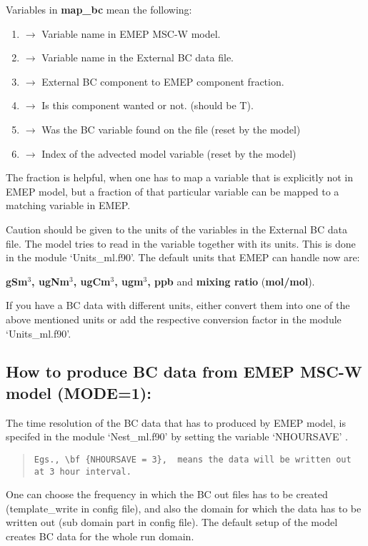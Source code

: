Variables in {\bf map\_bc} mean the following: 

\begin{enumerate}
\item ${\rightarrow}$  Variable name in EMEP MSC-W model.
\item ${\rightarrow}$  Variable name in the External BC data file. 
\item ${\rightarrow}$  External BC component to EMEP component fraction.  
\item ${\rightarrow}$  Is this component wanted or not.  (should be T). 
\item ${\rightarrow}$  Was the BC variable found on the file (reset by the model)
\item ${\rightarrow}$  Index of the advected model variable (reset by the model)			 
\end{enumerate}

The fraction is helpful, when one has to map a variable that is explicitly not in EMEP 	model, but a fraction of that particular variable can be mapped to a matching variable in EMEP.

Caution should be given to the units of the variables in the External BC data file.  The model tries to read in the variable together with its units.  This is done in the module `Units\_ml.f90'.  The default units that EMEP can handle now are: 

	{\bf gSm$^{3}$, ugNm$^{3}$, ugCm$^{3}$,  ugm$^{3}$, ppb} and {\bf mixing ratio} ({\bf mol/mol}).

If you have a BC data with different units, either convert them into one of the above 	mentioned units or add the respective conversion factor in the module `Units\_ml.f90'.  

\subsection{How to produce BC data from EMEP MSC-W model (MODE=1):}
	
The time resolution of the BC data that has to produced by EMEP model, is specifed in the module `Nest\_ml.f90' by setting the variable `NHOURSAVE' . 
 
\begin{quote}
\begin{verbatim}
Egs., \bf {NHOURSAVE = 3},  means the data will be written out at 3 hour interval. 
\end{verbatim}
\end{quote}

One can choose the frequency in which the BC out files has to be created (template\_write in config file), and also the domain for which the data has to be written out (sub domain part in config file).  The default setup of the model creates BC data for the whole run domain. 
 
